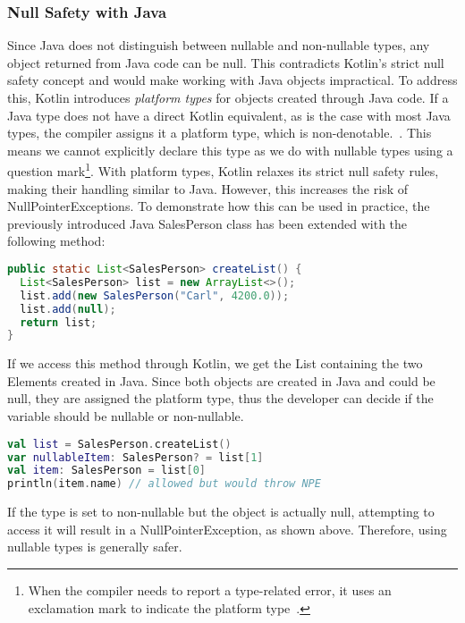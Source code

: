 \documentclass[a4paper,11pt]{article}
\begin{document}
\subsubsection{Null Safety with Java}
Since Java does not distinguish between nullable and non-nullable types, any object returned from Java code can be null. This contradicts Kotlin's strict null safety concept and would make working with Java objects impractical.
To address this, Kotlin introduces \textit{platform types} for objects created through Java code. If a Java type does not have a direct Kotlin equivalent, as is the case with most Java types, the compiler assigns it a platform type, which is non-denotable.~\cite{interop-null-safety}. This means we cannot explicitly declare this type as we do with nullable types using a question mark\footnote{When the compiler needs to report a type-related error, it uses an exclamation mark to indicate the platform type~\cite{interop-platform-notation}.}. With platform types, Kotlin relaxes its strict null safety rules, making their handling similar to Java. However, this increases the risk of NullPointerExceptions.
To demonstrate how this can be used in practice, the previously introduced Java SalesPerson class has been extended with the following method:
\begin{lstlisting}[language=Java]
public static List<SalesPerson> createList() {
  List<SalesPerson> list = new ArrayList<>();
  list.add(new SalesPerson("Carl", 4200.0));
  list.add(null);
  return list;
}
\end{lstlisting}
If we access this method through Kotlin, we get the List containing the two Elements created in Java. Since both objects are created in Java and could be null, they are assigned the platform type, thus the developer can decide if the variable should be nullable or non-nullable.
\begin{lstlisting}[language=Kotlin]  
val list = SalesPerson.createList()
var nullableItem: SalesPerson? = list[1]
val item: SalesPerson = list[0]
println(item.name) // allowed but would throw NPE
\end{lstlisting}
If the type is set to non-nullable but the object is actually null, attempting to access it will result in a NullPointerException, as shown above. Therefore, using nullable types is generally safer.
\end{document}
